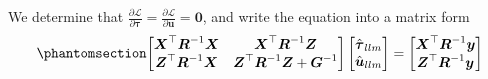 \documentclass[
  a4paper,
  oneside,
  openany,
  12pt,
  onecolumn]{book}
\theoremstyle{plain}
\theoremstyle{definition}
\theoremstyle{remark}
\begin{document}
We determine that
\(\frac{\partial\mathscr{L}}{\partial\boldsymbol{\tau}}=\frac{\partial\mathscr{L}}{\partial\boldsymbol{u}}=\boldsymbol{0}\),
and write the equation into a matrix form
\begin{equation}\phantomsection\label{eq-ll}{
\begin{bmatrix}
\boldsymbol{X}^\top\boldsymbol{R}^{-1}\boldsymbol{X} & \boldsymbol{X}^\top\boldsymbol{R}^{-1}\boldsymbol{Z}\\
\boldsymbol{Z}^\top\boldsymbol{R}^{-1}\boldsymbol{X} & \boldsymbol{Z}^\top\boldsymbol{R}^{-1}\boldsymbol{Z}+ \boldsymbol{G}^{-1}
\end{bmatrix}
\begin{bmatrix}
\hat{\boldsymbol{\tau}}_{llm}\\
\hat{\boldsymbol{u}}_{llm}
\end{bmatrix}=
\begin{bmatrix}
\boldsymbol{X}^\top\boldsymbol{R}^{-1}\boldsymbol{y}\\
\boldsymbol{Z}^\top\boldsymbol{R}^{-1}\boldsymbol{y}
\end{bmatrix}
}\end{equation}
\end{document}
